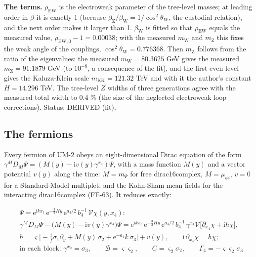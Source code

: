 \documentclass[
  10pt,
]{article}
\begin{document}
\textbf{The terms.} \(\rho_{\mathrm{EW}}\) is the electroweak parameter
of the tree-level masses; at leading order in \(\beta\) it is exactly 1
(because
\(\beta_{\mathrm{Z}}/\beta_{\mathrm{W}} = 1/\cos^2\theta_{\mathrm{W}}\),
the custodial relation), and the next order makes it larger than 1.
\(\beta_{\mathrm{W}}\) is fitted so that \(\rho_{\mathrm{EW}}\) equals
the measured value, \(\rho_{\mathrm{EW},0} - 1 = 0.00038\); with the
measured \(m_{\mathrm{W}}\) and \(m_{\mathrm{Z}}\) this fixes the weak
angle of the couplings, \(\cos^2\theta_{\mathrm{W}} = 0.776368\). Then
\(m_{\mathrm{Z}}\) follows from the ratio of the eigenvalues: the
measured \(m_{\mathrm{W}} = 80.3625\) GeV gives the measured
\(m_{\mathrm{Z}} = 91.1879\) GeV (to \(10^{-8}\), a consequence of the
fit), and the first even level gives the Kaluza-Klein scale
\(m_{\mathrm{KK}} = 121.32\) TeV and with it the author's constant
\(H = 14.296\) TeV. The tree-level \(Z\) widths of three generations
agree with the measured total width to 0.4 \% (the size of the neglected
electroweak loop corrections). Status: DERIVED (fit).

\hypertarget{the-fermions}{%
\subsection{The fermions}\label{the-fermions}}

Every fermion of UM-2 obeys an eight-dimensional Dirac equation of the
form \(\gamma^MD_M\Psi = (M(y) - \mathrm{i}v(y)\gamma^{x_4})\Psi\), with
a mass function \(M(y)\) and a vector potential \(v(y)\) along the time:
\(M = m_\Psi\) for free dirac16complex, \(M = \mu_{\psi i}\), \(v = 0\)
for a Standard-Model multiplet, and the Kohn-Sham mean fields for the
interacting dirac16complex (FE-63). It reduces exactly:

\[
\begin{aligned}
&\Psi = \mathrm{e}^{\mathrm{i}kx_1}\,\mathrm{e}^{-\frac32Hy}\,\mathrm{e}^{a_4/2}\,b_4^{-1}\,\mathcal{V}
 \chi(y, x_4):\\
&\gamma^MD_M\Psi - \big(M(y) - \mathrm{i}v(y)\gamma^{x_4}\big)\Psi
 = \mathrm{e}^{\mathrm{i}kx_1}\,\mathrm{e}^{-\frac32Hy}\,\mathrm{e}^{a_4/2}\,b_4^{-1}\,\gamma^{x_4}\mathcal{V}
 \big[\partial_{x_4}\chi + \mathrm{i}h\chi\big],\\
&h = \varsigma\Big[-\frac{\mathrm{i}}{f}\sigma_1\partial_y + M(y)\,\sigma_2 +
 \mathrm{e}^{-a_4}k\,\sigma_3\Big] + v(y),\qquad
 \mathrm{i}\,\partial_{x_4}\chi = h\chi;\\
&\text{in each block: }\gamma^{x_0} = \sigma_3,\qquad \mathcal{B} = \varsigma\varsigma_2,\qquad
 C = \varsigma_2\sigma_2,\qquad \Gamma_4 = -\varsigma\varsigma_2\sigma_3
\end{aligned} \tag{FE-56}
\]
\end{document}
